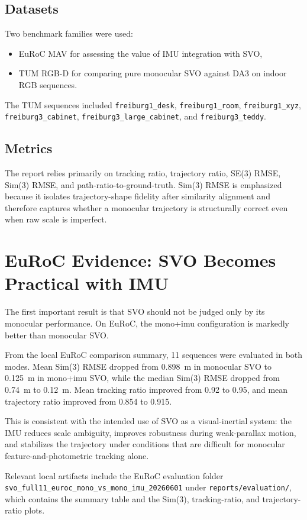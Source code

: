 \documentclass[conference]{IEEEtran}
\begin{document}
\subsection{Datasets}
Two benchmark families were used:
\begin{itemize}
\item EuRoC MAV for assessing the value of IMU integration with SVO,
\item TUM RGB-D for comparing pure monocular SVO against DA3 on indoor RGB sequences.
\end{itemize}

The TUM sequences included \texttt{freiburg1\_desk}, \texttt{freiburg1\_room}, \texttt{freiburg1\_xyz}, \texttt{freiburg3\_cabinet}, \texttt{freiburg3\_large\_cabinet}, and \texttt{freiburg3\_teddy}.

\subsection{Metrics}
The report relies primarily on tracking ratio, trajectory ratio, SE(3) RMSE, Sim(3) RMSE, and path-ratio-to-ground-truth. Sim(3) RMSE is emphasized because it isolates trajectory-shape fidelity after similarity alignment and therefore captures whether a monocular trajectory is structurally correct even when raw scale is imperfect.

\section{EuRoC Evidence: SVO Becomes Practical with IMU}
The first important result is that SVO should not be judged only by its monocular performance. On EuRoC, the mono+imu configuration is markedly better than monocular SVO.

From the local EuRoC comparison summary, 11 sequences were evaluated in both modes. Mean Sim(3) RMSE dropped from 0.898~m in monocular SVO to 0.125~m in mono+imu SVO, while the median Sim(3) RMSE dropped from 0.74~m to 0.12~m. Mean tracking ratio improved from 0.92 to 0.95, and mean trajectory ratio improved from 0.854 to 0.915.

This is consistent with the intended use of SVO as a visual-inertial system: the IMU reduces scale ambiguity, improves robustness during weak-parallax motion, and stabilizes the trajectory under conditions that are difficult for monocular feature-and-photometric tracking alone.

Relevant local artifacts include the EuRoC evaluation folder
\texttt{svo\_full11\_euroc\_mono\_vs\_mono\_imu\_20260601} under
\texttt{reports/evaluation/}, which contains the summary table and the Sim(3), tracking-ratio, and trajectory-ratio plots.
\end{document}
